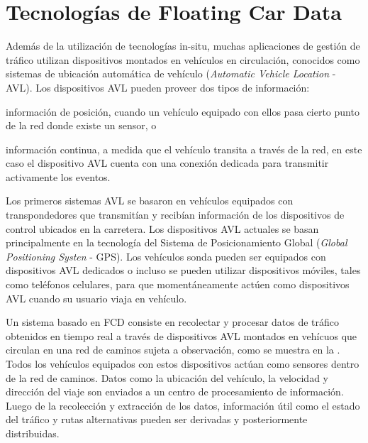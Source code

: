 \section{Tecnologías de Floating Car Data}

Además de la utilización de tecnologías in-situ, muchas aplicaciones de gestión de tráfico utilizan dispositivos montados en vehículos en circulación, conocidos como sistemas de ubicación automática de vehículo (\emph{Automatic Vehicle Location} - AVL). Los dispositivos AVL pueden proveer dos tipos de información: \begin{enumerate*}[a)]
\item información de posición, cuando un vehículo equipado con ellos pasa cierto punto de la red donde existe un sensor, o \item información continua, a medida que el vehículo transita a través de la red, en este caso el dispositivo AVL cuenta con una conexión dedicada para transmitir activamente los eventos.
\end{enumerate*}

Los primeros sistemas AVL se basaron en vehículos equipados con transpondedores que transmitían y recibían información de los dispositivos de control ubicados en la carretera. Los dispositivos AVL actuales se basan principalmente en la tecnología del Sistema de Posicionamiento Global (\emph{Global Positioning Systen} - GPS). Los vehículos sonda pueden ser equipados con dispositivos AVL dedicados o incluso se pueden utilizar dispositivos móviles, tales como teléfonos celulares, para que momentáneamente actúen como dispositivos AVL cuando su usuario viaja en vehículo.  

Un sistema basado en FCD consiste en recolectar y procesar datos de tráfico obtenidos en tiempo real a través de dispositivos AVL montados en vehícuos que circulan en una red de caminos sujeta a observación, como se muestra en la . Todos los vehículos equipados con estos dispositivos actúan como sensores dentro de la red de caminos. Datos como la ubicación del vehículo, la velocidad y dirección del viaje son enviados a un centro de procesamiento de información. Luego de la recolección y extracción de los datos, información útil como el estado del tráfico y rutas alternativas pueden ser derivadas y posteriormente distribuidas.

